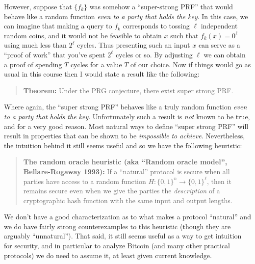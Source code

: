 However, suppose that \(\{ f_k \}\) was somehow a ``super-strong PRF''
that would behave like a random function \emph{even to a party that
holds the key}. In this case, we can imagine that making a query to
\(f_k\) corresponds to tossing \(\ell\) independent random coins, and it
would not be feasible to obtain \(x\) such that \(f_k(x)=0^\ell\) using
much less than \(2^\ell\) cycles. Thus presenting such an input \(x\)
can serve as a ``proof of work'' that you've spent \(2^\ell\) cycles or
so. By adjusting \(\ell\) we can obtain a proof of spending \(T\) cycles
for a value \(T\) of our choice. Now if things would go as usual in this
course then I would state a result like the following:

\begin{quote}
\textbf{Theorem:} Under the PRG conjecture, there exist super strong
PRF.
\end{quote}

Where again, the ``super strong PRF'' behaves like a truly random
function \emph{even to a party that holds the key}. Unfortunately such a
result is \emph{not} known to be true, and for a very good reason. Most
natural ways to define ``super strong PRF'' will result in properties
that can be shown to be \emph{impossible to achieve}. Nevertheless, the
intuition behind it still seems useful and so we have the following
heuristic:

\begin{quote}
\textbf{The random oracle heuristic (aka ``Random oracle model'',
Bellare-Rogaway 1993):} If a ``natural'' protocol is secure when all
parties have access to a random function
\(H:\{0,1\}^n\rightarrow\{0,1\}^\ell\), then it remains secure even when
we give the parties the \emph{description} of a cryptographic hash
function with the same input and output lengths.
\end{quote}

We don't have a good characterization as to what makes a protocol
``natural'' and we do have fairly strong counterexamples to this
heuristic (though they are arguably ``unnatural''). That said, it still
seems useful as a way to get intuition for security, and in particular
to analyze Bitcoin (and many other practical protocols) we do need to
assume it, at least given current knowledge.

\hypertarget{romcaveatrem}{}

